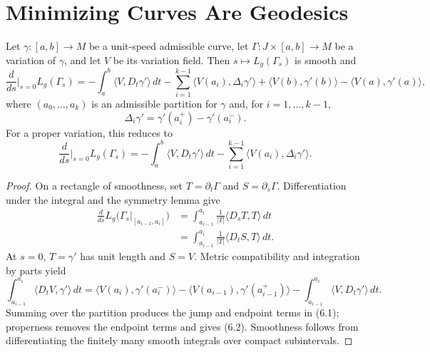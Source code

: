 \section{Minimizing Curves Are Geodesics}

\begin{theorem}
\label{thm:first-variation-formula}

Let $\gamma:[a,b]\to M$ be a unit-speed admissible curve, let
$\Gamma:J\times[a,b]\to M$ be a variation of $\gamma$, and let $V$ be its
variation field.  Then $s\mapsto L_g(\Gamma_s)$ is smooth and
\begin{equation}
\frac{d}{ds}\bigg|_{s=0} L_g(\Gamma_s)
=-\int_a^b\langle V,D_t\gamma'\rangle\,dt
-\sum_{i=1}^{k-1}\langle V(a_i),\Delta_i\gamma'\rangle
+\langle V(b),\gamma'(b)\rangle-\langle V(a),\gamma'(a)\rangle, \tag{6.1}
\end{equation}
where $(a_0,\ldots,a_k)$ is an admissible partition for $\gamma$ and, for
$i=1,\ldots,k-1$,
\[
\Delta_i\gamma'=\gamma'(a_i^+)-\gamma'(a_i^-).
\]
For a proper variation, this reduces to
\begin{equation}
\frac{d}{ds}\bigg|_{s=0} L_g(\Gamma_s)
=-\int_a^b\langle V,D_t\gamma'\rangle\,dt
-\sum_{i=1}^{k-1}\langle V(a_i),\Delta_i\gamma'\rangle. \tag{6.2}
\end{equation}
\end{theorem}

\begin{proof}
\sketch
On a rectangle of smoothness, set
$T=\partial_t\Gamma$ and $S=\partial_s\Gamma$.  Differentiation under the
integral and the symmetry lemma give
\begin{align*}
\frac{d}{ds}L_g\bigl(\Gamma_s|_{[a_{i-1},a_i]}\bigr)
&=\int_{a_{i-1}}^{a_i}\frac{1}{|T|}
\langle D_sT,T\rangle\,dt \\
&=\int_{a_{i-1}}^{a_i}\frac{1}{|T|}
\langle D_tS,T\rangle\,dt. \tag{6.3}
\end{align*}
At $s=0$, $T=\gamma'$ has unit length and $S=V$.  Metric compatibility and
integration by parts yield
\[
\int_{a_{i-1}}^{a_i}\langle D_tV,\gamma'\rangle\,dt
=\langle V(a_i),\gamma'(a_i^-)\rangle
-\langle V(a_{i-1}),\gamma'(a_{i-1}^+)\rangle
-\int_{a_{i-1}}^{a_i}\langle V,D_t\gamma'\rangle\,dt.
\]
Summing over the partition produces the jump and endpoint terms in (6.1);
properness removes the endpoint terms and gives (6.2).  Smoothness follows
from differentiating the finitely many smooth integrals over compact
subintervals.
\end{proof}

